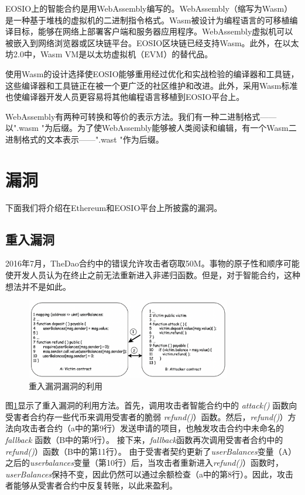 \documentclass{SCIS2022cn}
\begin{document}
EOSIO上的智能合约是用WebAssembly编写的。WebAssembly（缩写为Wasm）是一种基于堆栈的虚拟机的二进制指令格式。Wasm被设计为编程语言的可移植编译目标，能够在网络上部署客户端和服务器应用程序。WebAssembly虚拟机可以被嵌入到网络浏览器或区块链平台。EOSIO区块链已经支持Wasm。此外，在以太坊2.0中，Wasm VM是以太坊虚拟机（EVM）的替代品。

使用Wasm的设计选择使EOSIO能够重用经过优化和实战检验的编译器和工具链，这些编译器和工具链正在被一个更广泛的社区维护和改进。此外，采用Wasm标准也使编译器开发人员更容易将其他编程语言移植到EOSIO平台上。

WebAssembly有两种可转换和等价的表示方法。我们有一种二进制格式——以".wasm "为后缀。为了使WebAssembly能够被人类阅读和编辑，有一个Wasm二进制格式的文本表示——".wast "作为后缀。

\section{漏洞}

下面我们将介绍在Ethereum和EOSIO平台上所披露的漏洞。

\subsection{重入漏洞}

2016年7月，TheDao合约中的错误允许攻击者窃取50M。事物的原子性和顺序可能使开发人员认为在终止之前无法重新进入非递归函数。但是，对于智能合约，这种想法并不是如此。

\begin{figure}[htbp]
    \centering
    \includegraphics[width=0.8\textwidth]{image/pic1.png}
    \caption{重入漏洞漏洞的利用}
    \label{pic1}
\end{figure}

图\ref{pic1}显示了重入漏洞的利用方法。首先，调用攻击者智能合约中的 \textit{attack()} 函数向受害者合约存一些代币来调用受害者的脆弱 \textit{refund()}）函数。然后，\textit{refund()}）方法向攻击者合约（a中的第9行）发送申请的项目，也触发攻击合约中未命名的 \textit{fallback} 函数（B中的第9行）。 接下来，\textit{fallback}函数再次调用受害者合约中的\textit{refund()}）函数（B中的第11行）。 由于受害者契约更新了\textit{userBalances}变量（A）之后的\textit{userbalances}变量（第10行）后，当攻击者重新进入\textit{refund()}）函数时，\textit{userBalances}保持不变，因此仍然可以通过余额检查（a中的第8行）。因此，攻击者能够从受害者合约中反复转账，以此来盈利。
\end{document}
